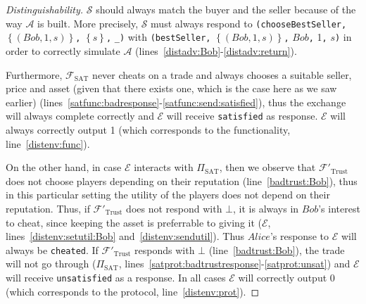\begin{proof}[Distinguishability]
    $\mathcal{S}$ should always match the buyer and the seller because of the way
    $\mathcal{A}$ is built. More precisely, $\mathcal{S}$ must always respond to
    \texttt{(chooseBestSeller,} $\left\{\left(Bob, 1, s\right)\right\}$\texttt{,}
    $\left\{s\right\}$\texttt{,} \texttt{\_)} with \texttt{(bestSeller,}
    $\left\{\left(Bob, 1, s\right)\right\}$\texttt{,} $Bob$\texttt{,} 1\texttt{,}
    $s$\texttt{)} in order to correctly simulate $\mathcal{A}$
    (lines~\ref{distadv:Bob}-\ref{distadv:return}).

    Furthermore, $\mathcal{F}_{\mathrm{SAT}}$ never cheats on a trade and always chooses a
    suitable seller, price and asset (given that there exists one, which is the case here
    as we saw earlier) (lines~\ref{satfunc:badresponse}-\ref{satfunc:send:satisfied}),
    thus the exchange will always complete correctly and $\mathcal{E}$ will receive
    \texttt{satisfied} as response. $\mathcal{E}$ will always correctly output 1 (which
    corresponds to the functionality, line~\ref{distenv:func}).

    On the other hand, in case $\mathcal{E}$ interacts with $\Pi_{\mathrm{SAT}}$, then we
    observe that $\mathcal{F}'_{\mathrm{Trust}}$ does not choose players depending on
    their reputation (line~\ref{badtrust:Bob}), thus in this particular setting the
    utility of the players does not depend on their reputation. Thus, if
    $\mathcal{F}'_{\mathrm{Trust}}$ does not respond with $\bot$, it is always in $Bob$'s
    interest to cheat, since keeping the asset is preferrable to giving it ($\mathcal{E}$,
    lines~\ref{distenv:setutil:Bob} and~\ref{distenv:sendutil}). Thus $Alice$'s response
    to $\mathcal{E}$ will always be \texttt{cheated}. If $\mathcal{F}'_{\mathrm{Trust}}$
    responds with $\bot$ (line~\ref{badtrust:Bob}), the trade will not go through
    ($\Pi_{\mathrm{SAT}}$, lines~\ref{satprot:badtrustresponse}-\ref{satprot:unsat}) and
    $\mathcal{E}$ will receive \texttt{unsatisfied} as a response. In all cases
    $\mathcal{E}$ will correctly output 0 (which corresponds to the protocol,
    line~\ref{distenv:prot}).
  \end{proof}
